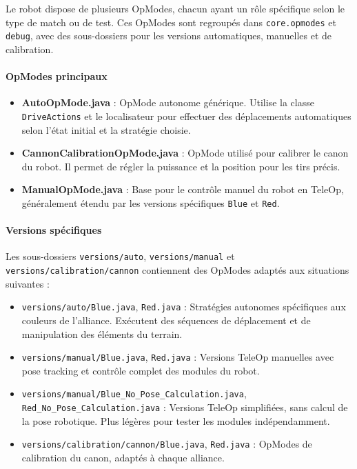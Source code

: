 \documentclass[12pt, a4paper]{report}
\begin{document}
    Le robot dispose de plusieurs OpModes, chacun ayant un rôle spécifique selon le type de match ou de test. Ces OpModes sont regroupés dans \texttt{core.opmodes} et \texttt{debug}, avec des sous-dossiers pour les versions automatiques, manuelles et de calibration.


    \paragraph{OpModes principaux}

    \begin{itemize}
        \item \textbf{AutoOpMode.java} : OpMode autonome générique. Utilise la classe \texttt{DriveActions} et le localisateur pour effectuer des déplacements automatiques selon l'état initial et la stratégie choisie.

        \item \textbf{CannonCalibrationOpMode.java} : OpMode utilisé pour calibrer le canon du robot. Il permet de régler la puissance et la position pour les tirs précis.

        \item \textbf{ManualOpMode.java} : Base pour le contrôle manuel du robot en TeleOp, généralement étendu par les versions spécifiques \texttt{Blue} et \texttt{Red}.
    \end{itemize}

    \paragraph{Versions spécifiques}

    Les sous-dossiers \texttt{versions/auto}, \texttt{versions/manual} et\\ \texttt{versions/calibration/cannon} contiennent des OpModes adaptés aux situations suivantes :

    \begin{itemize}
        \item \texttt{versions/auto/Blue.java}, \texttt{Red.java} : Stratégies autonomes spécifiques aux couleurs de l’alliance. Exécutent des séquences de déplacement et de manipulation des éléments du terrain.

        \item \texttt{versions/manual/Blue.java}, \texttt{Red.java} : Versions TeleOp manuelles avec pose tracking et contrôle complet des modules du robot.

        \item \texttt{versions/manual/Blue\_No\_Pose\_Calculation.java}, \texttt{Red\_No\_Pose\_Calculation.java} : Versions TeleOp simplifiées, sans calcul de la pose robotique. Plus légères pour tester les modules indépendamment.

        \item \texttt{versions/calibration/cannon/Blue.java}, \texttt{Red.java} : OpModes de calibration du canon, adaptés à chaque alliance.
    \end{itemize}
\end{document}
